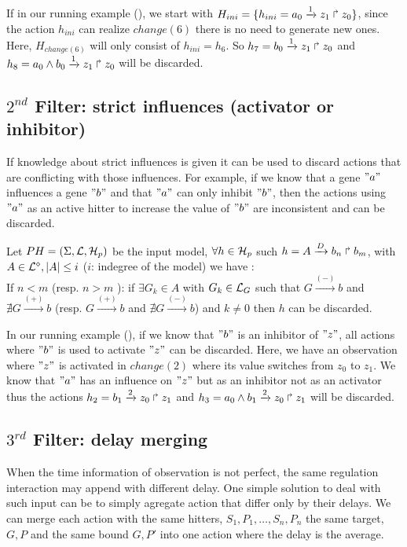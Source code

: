 If in our running example (),
we start with $H_{ini}=\{h_{ini}=a_0\xrightarrow{1} z_1 \Rsh z_0\}$,
since the action $h_{ini}$ can realize $change(6)$ there is no need to generate new ones.
Here, $H_{change(6)}$ will only consist of $h_{ini} = h_6$. So $h_7=b_0\xrightarrow{1} z_1 \Rsh z_0$ and $h_8=a_0 \wedge b_0 \xrightarrow{1} z_1 \Rsh z_0 $ will be discarded. 

\subsection{$2^{nd}$ Filter: strict influences (activator or inhibitor)}

If knowledge about strict influences is given it can be used to discard actions that are conflicting with those influences.
For example, if we know that a gene $"a"$ influences a gene $"b"$ and that $"a"$ can only inhibit $"b"$, then the actions using $"a"$ as an active hitter to increase the value of $"b"$ are inconsistent and can be discarded.

\begin{definition}
Let $PH=(\Sigma,\mathcal{L},\mathcal{H}_p)$ be the input model, $\forall h \in \mathcal{H}_p$ such $h=A\xrightarrow{D} b_n \Rsh b_m$, with $ A \in \mathcal{L}^{\diamond}, | A| \leq i$ ($i$: indegree of the model) we have :\\
If $n < m$ (resp. $n > m$ ): if $\exists G_k \in A $ with $G_k \in \mathcal{L}_G $ such that $G \xrightarrow{(-)} b$ and $\nexists G \xrightarrow{(+)} b$ (resp. $G \xrightarrow{(+)} b$ and $\nexists G \xrightarrow{(-)} b$) and $k \neq 0$ then $h$ can be discarded.
\end{definition}

In our running example (), if we know that $"b"$ is an inhibitor of $"z"$, all actions where $"b"$ is used to activate $"z"$ can be discarded.
Here, we have an observation where $"z"$ is activated in $change(2)$ where its value switches from $z_0$ to $z_1$.
We know that $"a"$ has an influence on $"z"$ but as an inhibitor not as an activator thus the actions $h_2=b_1\xrightarrow{2} z_0 \Rsh z_1$ and $h_3=a_0 \wedge b_1 \xrightarrow{2} z_0 \Rsh z_1$ will be discarded.

\subsection{$3^{rd}$ Filter: delay merging}

When the time information of observation is not perfect, the same regulation interaction may append with different delay.
One simple solution to deal with such input can be to simply agregate action that differ only by their delays.
We can merge each action with the same hitters, $S_1,P_1,\ldots, S_n,P_n$ the same target, $G, P$ and the same bound $G, P'$ into one action where the delay is the average.

